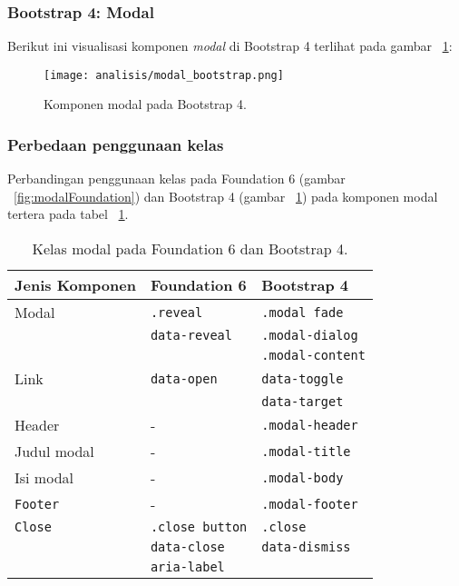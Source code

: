 \subsubsection{Bootstrap 4: Modal}
Berikut ini visualisasi komponen \textit{modal} di Bootstrap 4 terlihat pada gambar ~\ref{fig:modalBootstrap}:
\begin{figure} [H]
	\centering
	\texttt{[image: analisis/modal\_bootstrap.png]}
	\caption{Komponen modal pada Bootstrap 4.}
	\label{fig:modalBootstrap}
\end{figure}

\subsubsection{Perbedaan penggunaan kelas}
\noindent Perbandingan penggunaan kelas pada Foundation 6 (gambar ~\ref{fig:modalFoundation}) dan Bootstrap 4 (gambar ~\ref{fig:modalBootstrap}) pada komponen modal tertera pada tabel ~\ref{table:modal}.\\


\begin{table}[H] 
	\caption{Kelas modal pada Foundation 6 dan Bootstrap 4.}
	\begin{tabular}{| p{} | p{} | p{} |} 
		\hline
		\textbf{Jenis Komponen} & \textbf{Foundation 6} & \textbf{Bootstrap 4}  \\ [0.5ex] 
		\hline	
		Modal & \texttt{.reveal} & \texttt{.modal fade}\\ 
		&\texttt{data-reveal}&\texttt{.modal-dialog}\\
		&&\texttt{.modal-content}\\
		\hline
		Link & \texttt{data-open} & \texttt{data-toggle}\\
		&& \texttt{data-target}\\
		\hline
		Header & - & \texttt{.modal-header}\\ 
		\hline
		Judul modal & - & \texttt{.modal-title}\\ 
		\hline
		Isi modal & - & \texttt{.modal-body}\\ 
		\hline
		\texttt{Footer} & - & \texttt{.modal-footer}\\
		\hline
		\texttt{Close} & \texttt{.close button} & \texttt{.close}\\
		& \texttt{data-close} & \texttt{data-dismiss}\\
		& \texttt{aria-label}&\\[1ex]
		\hline
	\end{tabular}
	\label{table:modal}
\end{table}

